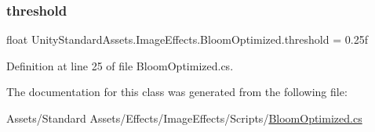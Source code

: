 \subsubsection{\texorpdfstring{threshold}{threshold}}
{\footnotesize\ttfamily float Unity\+Standard\+Assets.\+Image\+Effects.\+Bloom\+Optimized.\+threshold = 0.\+25f}



Definition at line 25 of file Bloom\+Optimized.\+cs.



The documentation for this class was generated from the following file\+:\begin{DoxyCompactItemize}
\item 
Assets/\+Standard Assets/\+Effects/\+Image\+Effects/\+Scripts/\mbox{\hyperlink{_bloom_optimized_8cs}{Bloom\+Optimized.\+cs}}\end{DoxyCompactItemize}
